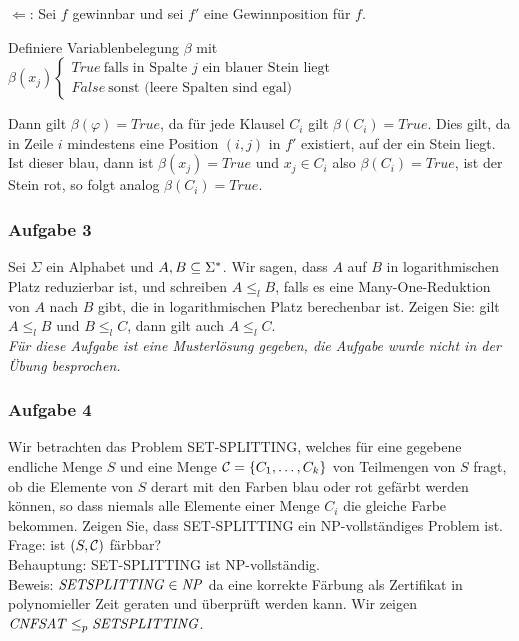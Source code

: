 \begin{enumerate}
            $\Leftarrow$: Sei $f$ gewinnbar und sei $f'$ eine Gewinnposition für $f$.

            Definiere Variablenbelegung $\beta$ mit $\beta(x_{j})
            \begin{cases}
                True\ \text{falls in Spalte $j$ ein blauer Stein liegt} \\
                False\ \text{sonst (leere Spalten sind egal)}
            \end{cases}$

            Dann gilt $\beta(\varphi) = True$, da für jede Klausel $C_{i}$ gilt $\beta(C_{i}) = True$. Dies gilt, da in Zeile $i$ mindestens eine Position $(i,j)$ in $f'$ existiert, auf der ein Stein liegt. Ist dieser blau, dann ist $\beta(x_{j}) = True$ und $x_{j} \in C_{i}$ also $\beta(C_{i}) = True$, ist der Stein rot, so folgt analog $\beta(C_{i}) = True$.
    \end{enumerate}


\subsubsection*{Aufgabe 3}
    Sei $\Sigma$ ein Alphabet und $A, B \subseteq \Sigma^{*}$. Wir sagen, dass $A$ auf $B$ in logarithmischen Platz reduzierbar ist, und schreiben $A \leq_{l} B$, falls es eine Many-One-Reduktion von $A$ nach $B$ gibt, die in logarithmischen Platz berechenbar ist. Zeigen Sie: gilt $A \leq_{l} B$ und $B \leq_{l} C$, dann gilt auch $A \leq_{l} C$. \\

    \textit{Für diese Aufgabe ist eine Musterlösung gegeben, die Aufgabe wurde nicht in der Übung besprochen.}


\subsubsection*{Aufgabe 4}
    Wir betrachten das Problem SET-SPLITTING, welches für eine gegebene endliche Menge $S$ und eine Menge $\mathcal{C} = \{ C_{1}, \dots, C_{k}\}$ von Teilmengen von $S$ fragt, ob die Elemente von $S$ derart mit den Farben blau oder rot gefärbt werden können, so dass niemals alle Elemente einer Menge $C_{i}$ die gleiche Farbe bekommen. Zeigen Sie, dass SET-SPLITTING ein NP-vollständiges Problem ist. \\

    \LOES Frage: ist $(S, \mathcal{C})$ färbbar? \\
    Behauptung: SET-SPLITTING ist NP-vollständig. \\
    Beweis: $\mathit{SETSPLITTING} \in \mathit{NP}$ da eine korrekte Färbung als Zertifikat in polynomieller Zeit geraten und überprüft werden kann. Wir zeigen $\mathit{CNFSAT} \leq_{p} \mathit{SETSPLITTING}$.{}

